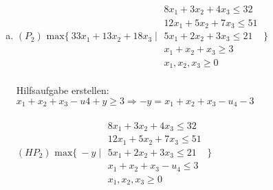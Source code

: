 \documentclass[a4paper,10pt]{article}
\begin{document}
\begin{enumerate}[a)]
\[\begin{tabular}{cc|cc}
		\end{tabular}
		\setlength{\extrarowheight}{0pt}
		\]
		Da $B^+ = \{\varnothing\}$ ist kein Pivotelement w"ahlbar und das Problem somit nicht l"osbar.
		\item $(P_2) \text{ max} \{\ 33x_1 + 13x_2 + 18x_3 \mid \begin{matrix}
		8x_1 + 3x_2 + 4x_3 \leq 32\\
		12x_1 + 5x_2 +7x_3 \leq 51\\
		5x_1 + 2x_2 + 3x_3 \leq 21\\
		x_1 + x_2 + x_3 \geq 3\\
		x_1, x_2, x_3 \geq 0
		\end{matrix}
		\ \} $\\\\
		Hilfsaufgabe erstellen: $x_1 + x_2 + x_3 - u4 + y \geq 3 \Rightarrow -y = x_1 + x_2 + x_3 - u_4 - 3$\\\\
		$ (HP_2) \text{ max} \{\ -y \mid \begin{matrix}
		8x_1 + 3x_2 + 4x_3 \leq 32\\
		12x_1 + 5x_2 +7x_3 \leq 51\\
		5x_1 + 2x_2 + 3x_3 \leq 21\\
		x_1 + x_2 + x_3 - u_4 \leq 3\\
		x_1, x_2, x_3 \geq 0
		\end{matrix}
		\ \} $
		

\end{enumerate}
\end{document}
